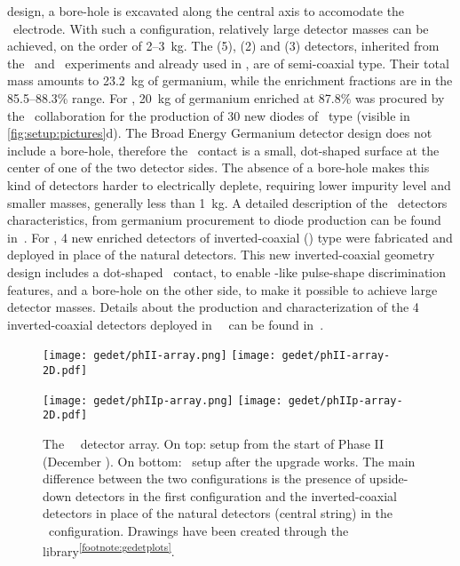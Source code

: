 design, a bore-hole is excavated along the central axis to accomodate the \pplus\
electrode. With such a configuration, relatively large detector masses can be achieved, on
the order of 2--3~kg. The \ANG{} (5), \RG{} (2) and \GTF{} (3) detectors, inherited from
the \hdm\ and \igex\ experiments and already used in \phaseone, are of semi-coaxial type.
Their total mass amounts to 23.2~kg of germanium, while the enrichment fractions are in
the 85.5--88.3\% range. For \phasetwo, 20~kg of germanium enriched at 87.8\% was procured
by the \gerda\ collaboration for the production of 30 new diodes of \bege\ type (visible
in \cref{fig:setup:pictures}d). The Broad Energy Germanium detector design does not
include a bore-hole, therefore the \pplus\ contact is a small, dot-shaped surface at the
center of one of the two detector sides. The absence of a bore-hole makes this kind of
detectors harder to electrically deplete, requiring lower impurity level and
smaller masses, generally less than 1~kg. A detailed description of the \bege\ detectors
characteristics, from germanium procurement to diode production can be found
in~\cite{Agostini2015e, Agostini2018a, Agostini2019}. For \phasetwop, 4 new enriched \IC{}
detectors of inverted-coaxial (\icoax) type were fabricated and deployed in place of the
natural \GTF{} detectors. This new inverted-coaxial geometry design includes a dot-shaped
\pplus\ contact, to enable \bege-like pulse-shape discrimination features, and a bore-hole
on the other side, to make it possible to achieve large detector masses.  Details about
the production and characterization of the 4 inverted-coaxial detectors deployed in
\gerda\ \phasetwop\ can be found in~\cite{Miloradovic2020, Agostini2021b}.

\begin{figure}
  \centering
  \texttt{[image: gedet/phII-array.png]}%
  \hspace{0.5cm}%
  \texttt{[image: gedet/phII-array-2D.pdf]}
  \vspace{0.5cm}

  \texttt{[image: gedet/phIIp-array.png]}%
  \hspace{0.5cm}%
  \texttt{[image: gedet/phIIp-array-2D.pdf]}
  \caption[placeholder]{%
    The \gerda\ \phasetwo\ detector array. On top: setup from the start of Phase II
    (December \yr{2015}). On bottom: \phasetwop\ setup after the \yr{2018} upgrade works.
    The main difference between the two configurations is the presence of upside-down
    detectors in the first configuration and the inverted-coaxial detectors in place of
    the natural detectors (central string) in the \phasetwop\ configuration. Drawings have
    been created through the \m{gedet-plots}
    library\textsuperscript{\ref{footnote:gedetplots}}.
  }\label{fig:setup:array}
\end{figure}

